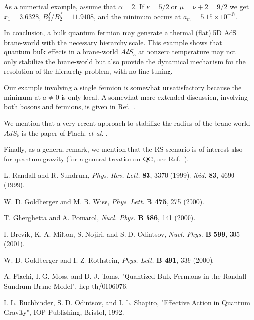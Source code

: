 \documentclass[a4paper,12pt]{article}
\begin{document}
As a numerical example, assume that $\alpha=2$. If $\nu=5/2$ or $\mu=\nu+2=9/2$ we get $x_1=3.6328$, $B_3^f/B_2^f=11.9408$, and the minimum occurs at $a_m=5.15 \times 10^{-17}$. 

In conclusion, a bulk quantum fermion may generate a thermal (flat) 5D AdS brane-world with the necessary hierarchy scale. This example shows that quantum bulk effects in a brane-world $AdS_5$ at nonzero temperature may not only stabilize the brane-world but also provide the dynamical mechanism for the resolution of the hierarchy problem, with no fine-tuning.

Our example involving a single fermion is somewhat unsatisfactory because the minimum at $a \neq 0$ is only local. A somewhat more extended discussion, involving both bosons and fermions, is given in Ref.~\cite{brevik01}.

We mention that a very recent approach to stabilize the radius of the brane-world $AdS_5$ is the paper of Flachi {\it et al.} \cite{flachi01}. 

Finally, as a general remark, we mention that the RS scenario is of interest also for quantum gravity (for a general treatise on QG, see Ref.~\cite{buchbinder92}).


\newpage

\begin{thebibliography}{99}

L. Randall and R. Sundrum, {\it Phys. Rev. Lett.} {\bf 83}, 3370 (1999); {\it ibid.} {\bf 83}, 4690 (1999).

W. D. Goldberger and M. B. Wise, {\it Phys. Lett.} {\bf B 475}, 275 (2000).

T. Gherghetta and A. Pomarol, {\it Nucl. Phys.} {\bf B 586}, 141 (2000).

I. Brevik, K. A. Milton, S. Nojiri, and S. D. Odintsov, {\it Nucl. Phys.} {\bf B 599}, 305 (2001).

W. D. Goldberger and I. Z. Rothstein, {\it Phys. Lett.} {\bf B 491}, 339 (2000).

A. Flachi, I. G. Moss, and D. J. Toms, "Quantized Bulk Fermions in the Randall-Sundrum Brane Model". hep-th/0106076.

I. L. Buchbinder, S. D. Odintsov, and I. L. Shapiro, "Effective Action in Quantum Gravity", IOP Publishing, Bristol, 1992. 




\end{thebibliography}
\end{document}
